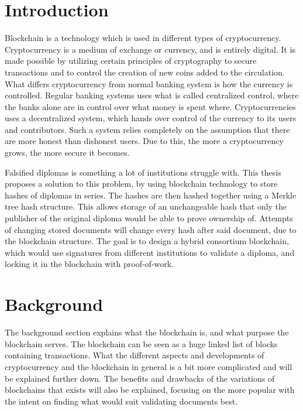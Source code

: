 \documentclass[11pt]{article}
\begin{document}
\newpage
{}
\setcounter{page}{\theCurrentPage}

\section{Introduction}

Blockchain is a technology which is used in different types of cryptocurrency. Cryptocurrency is a medium of exchange or currency, and is entirely digital. It is made possible by utilizing certain principles of cryptography to secure transactions and to control the creation of new coins added to the circulation. What differs cryptocurrency from normal banking system is how the currency is controlled. Regular banking systems uses what is called centralized control, where the banks alone are in control over what money is spent where. Cryptocurrencies uses a decentralized system, which hands over control of the currency to its users and contributors. Such a system relies completely on the assumption that there are more honest than dishonest users. Due to this, the more a cryptocurrency grows, the more secure it becomes. 

Falsified diplomas is something a lot of institutions struggle with. This thesis proposes a solution to this problem, by using blockchain technology to store hashes of diplomas in series. The hashes are then hashed together using a Merkle tree hash structure. This allows storage of an unchangeable hash that only the publisher of the original diploma would be able to prove ownership of. Attempts of changing stored documents will change every hash after said document, due to the blockchain structure. The goal is to design a hybrid consortium blockchain, which would use signatures from different institutions to validate a diploma, and locking it in the blockchain with proof-of-work. 

\section{Background}
The background section explains what the blockchain is, and what purpose the blockchain serves. The blockchain can be seen as a huge linked list of blocks containing transactions. What the different aspects and developments of cryptocurrency and the blockchain in general is a bit more complicated and will be explained further down. The benefits and drawbacks of the variations of blockchains that exists will also be explained, focusing on the more popular with the intent on finding what would suit validating documents best. 
\end{document}

